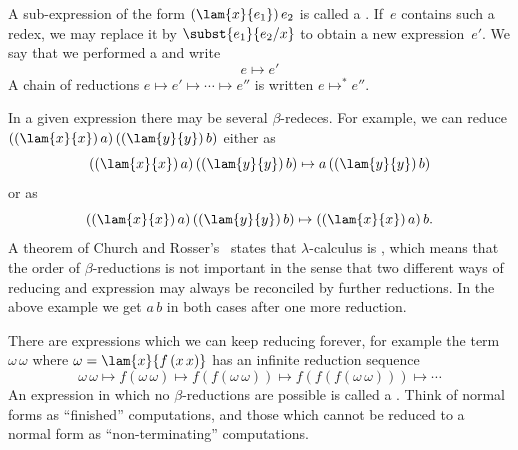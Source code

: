 A sub-expression of the form $(\lam{x}{e_1})\, e_2$ is called a .
If~$e$ contains such a redex, we may replace it by $\subst{e_1}{e_2/x}$ to obtain a new expression~$e'$. We say that we performed a  and write
%
\begin{equation*}
  e \mapsto e'
\end{equation*}
%
A chain of reductions $e \mapsto e' \mapsto \cdots \mapsto e''$ is written $e \mapsto^* e''$.

In a given expression there may be several $\beta$-redeces. For example, we can reduce
$((\lam{x}{x})\, a)\,((\lam{y}{y})\,b)$ either as
%
\begin{equation*}
  ((\lam{x}{x})\, a)\,((\lam{y}{y})\,b) \mapsto a\, ((\lam{y}{y})\,b)
\end{equation*}
%
or as
%
\begin{equation*}
  ((\lam{x}{x})\, a)\,((\lam{y}{y})\,b) \mapsto ((\lam{x}{x})\, a)\, b.
\end{equation*}
%
A theorem of Church and Rosser's~ states that
$\lambda$-calculus is , which means that the order of
$\beta$-reductions is not important in the sense that two different ways of
reducing and expression may always be reconciled by further reductions.
In the above example we get $a\,b$ in both cases after one more reduction.

There are expressions which we can keep reducing forever, for example
the term $\omega\,\omega$ where $\omega = \lam{x}{f\,(x\,x)}$ has an
infinite reduction sequence
%
\begin{equation*}
  \omega\, \omega \mapsto
  f(\omega\, \omega) \mapsto 
  f(f(\omega\, \omega)) \mapsto 
  f(f(f(\omega\, \omega))) \mapsto
  \cdots
\end{equation*}
%
An expression in which no $\beta$-reductions are possible is called a
. Think of normal forms as ``finished''
computations, and those which cannot be reduced to a normal form as
``non-terminating'' computations.

